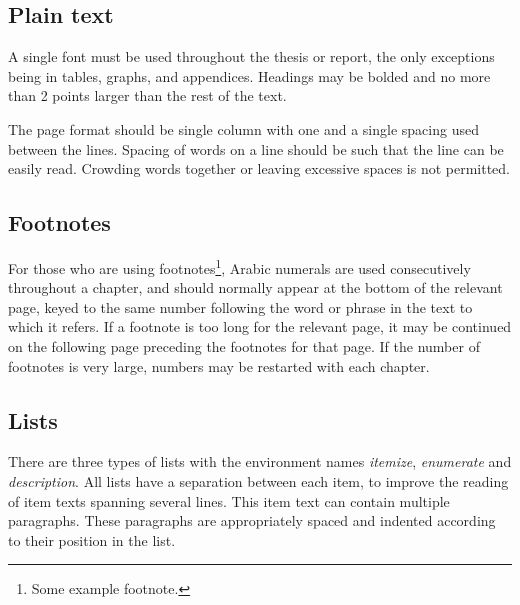 \subsection{Plain text}
\label{sec:plaintext}

A single font must be used throughout the thesis or report, the only exceptions being in tables, graphs, and appendices. Headings may be bolded and no more than 2 points larger than the rest of the text.

The page format should be single column with one and a single spacing used
between the lines. Spacing of words on a line should be such that the line can be easily read. Crowding words together or leaving excessive spaces is not permitted.

\subsection{Footnotes}
\label{sec:footnotes}


For those who are using footnotes\footnote{Some example footnote.}, Arabic numerals are used consecutively throughout a chapter, and should normally appear at the bottom of the relevant page, keyed to the same number following the word or phrase in the text to which it refers. If a footnote is too long for the relevant page, it may be continued on the following page preceding the footnotes for that page. If the number of footnotes is very large, numbers may be restarted with each chapter.


\subsection{Lists}
\label{sec:lists}

There are three types of lists with the environment names \emph{itemize}, \emph{enumerate} and \emph{description}. All lists have a separation between each item, to improve the reading of item texts spanning several lines. This item text can contain multiple paragraphs. These paragraphs are appropriately spaced and indented according to their position in the list. 

